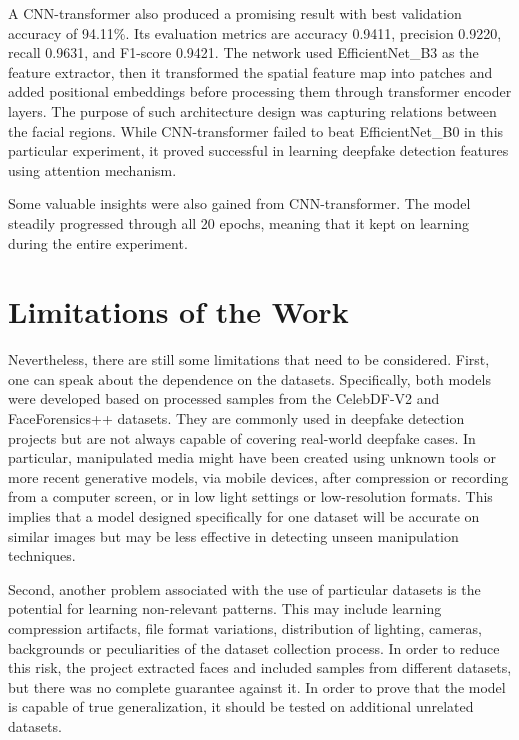 \documentclass[12pt,a4paper]{report}
\begin{document}
A CNN-transformer also produced a promising result with best validation accuracy of 94.11\%. Its evaluation metrics are accuracy 0.9411, precision 0.9220, recall 0.9631, and F1-score 0.9421. The network used EfficientNet\_B3 as the feature extractor, then it transformed the spatial feature map into patches and added positional embeddings before processing them through transformer encoder layers. The purpose of such architecture design was capturing relations between the facial regions. While CNN-transformer failed to beat EfficientNet\_B0 in this particular experiment, it proved successful in learning deepfake detection features using attention mechanism.

Some valuable insights were also gained from CNN-transformer. The model steadily progressed through all 20 epochs, meaning that it kept on learning during the entire experiment.



\section{Limitations of the Work}

Nevertheless, there are still some limitations that need to be considered. First, one can speak about the dependence on the datasets. Specifically, both models were developed based on processed samples from the CelebDF-V2 and FaceForensics++ datasets. They are commonly used in deepfake detection projects but are not always capable of covering real-world deepfake cases. In particular, manipulated media might have been created using unknown tools or more recent generative models, via mobile devices, after compression or recording from a computer screen, or in low light settings or low-resolution formats. This implies that a model designed specifically for one dataset will be accurate on similar images but may be less effective in detecting unseen manipulation techniques. 

Second, another problem associated with the use of particular datasets is the potential for learning non-relevant patterns. This may include learning compression artifacts, file format variations, distribution of lighting, cameras, backgrounds or peculiarities of the dataset collection process. In order to reduce this risk, the project extracted faces and included samples from different datasets, but there was no complete guarantee against it. In order to prove that the model is capable of true generalization, it should be tested on additional unrelated datasets.
\end{document}
